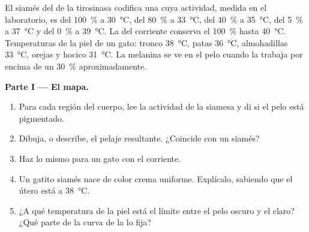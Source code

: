 \begin{problem}
\label{pb:g11:enzymes-and-phenotype:1}
El  siamés del  de la tirosinasa codifica una  cuya
actividad, medida en el laboratorio, es del \qty{100}{\percent} a
\qty{30}{\celsius}, del \qty{80}{\percent} a \qty{33}{\celsius}, del
\qty{40}{\percent} a \qty{35}{\celsius}, del \qty{5}{\percent} a
\qty{37}{\celsius} y del \qty{0}{\percent} a \qty{39}{\celsius}. La
 del  corriente conserva el \qty{100}{\percent} hasta
\qty{40}{\celsius}. Temperaturas de la piel de un gato: tronco
\qty{38}{\celsius}, patas \qty{36}{\celsius}, almohadillas
\qty{33}{\celsius}, orejas y hocico \qty{31}{\celsius}. La melanina se
ve en el pelo cuando la  trabaja por encima de un
\qty{30}{\percent} aproximadamente.

\medskip
\noindent\textbf{Parte I --- El mapa.}
\begin{enumerate}
  \item Para cada región del cuerpo, lee la actividad de la 
        siamesa y di si el pelo está pigmentado.
  \item Dibuja, o describe, el pelaje resultante. ¿Coincide con un
        siamés?
  \item Haz lo mismo para un gato con el  corriente.
  \item Un gatito siamés nace de color crema uniforme. Explícalo,
        sabiendo que el útero está a \qty{38}{\celsius}.
  \item ¿A qué temperatura de la piel está el límite entre el pelo
        oscuro y el claro? ¿Qué parte de la curva de la  lo fija?
\end{enumerate}


\end{problem}
